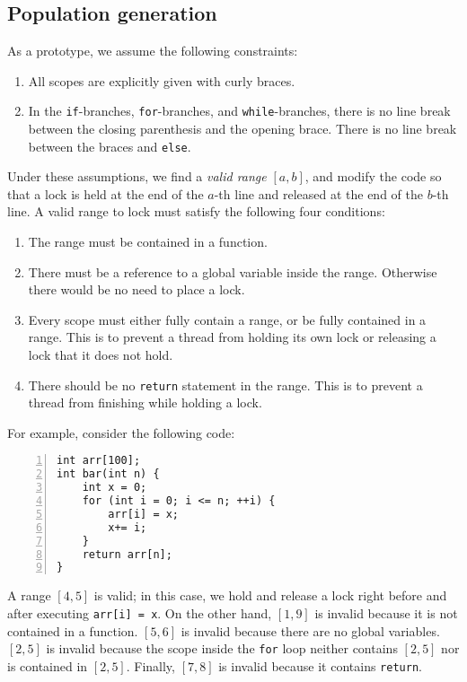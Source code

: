 \subsection{Population generation}

As a prototype, we assume the following constraints:

\begin{enumerate}
    \item All scopes are explicitly given with curly braces.
    \item In the \verb|if|-branches, \verb|for|-branches, and \verb|while|-branches, there is no line break between the closing parenthesis and the opening brace. There is no line break between the braces and \verb|else|.
\end{enumerate}

Under these assumptions, we find a \textit{valid range} $[a, b]$, and modify the code so that a lock is held at the end of the $a$-th line and released at the end of the $b$-th line. A valid range to lock must satisfy the following four conditions:

\begin{enumerate}
    \item The range must be contained in a function.
    \item There must be a reference to a global variable inside the range. Otherwise there would be no need to place a lock.
    \item Every scope must either fully contain a range, or be fully contained in a range. This is to prevent a thread from holding its own lock or releasing a lock that it does not hold.
    \item There should be no \verb|return| statement in the range. This is to prevent a thread from finishing while holding a lock.
\end{enumerate}

For example, consider the following code:


\begin{lstlisting}[frame=tb, xleftmargin=2em, framexleftmargin=1.5em, numbers=left]
int arr[100];
int bar(int n) {
    int x = 0;
    for (int i = 0; i <= n; ++i) {
        arr[i] = x;
        x+= i;
    }
    return arr[n];
}
\end{lstlisting}

A range $[4, 5]$ is valid; in this case, we hold and release a lock right before and after executing \verb|arr[i] = x|. On the other hand, $[1, 9]$ is invalid because it is not contained in a function. $[5, 6]$ is invalid because there are no global variables. $[2, 5]$ is invalid because the scope inside the \verb|for| loop neither contains $[2, 5]$ nor is contained in $[2, 5]$. Finally, $[7, 8]$ is invalid because it contains \verb|return|.

